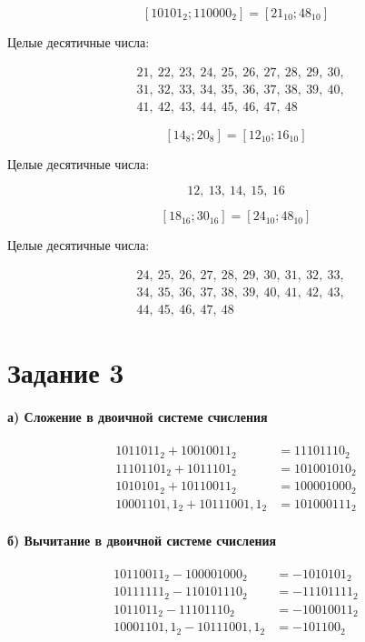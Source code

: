\documentclass[a4paper,12pt]{article}
\begin{document}
$$
[10101_2; 110000_2] = [21_{10}; 48_{10}]
$$

Целые десятичные числа:

$$
\begin{aligned}
&21,\ 22,\ 23,\ 24,\ 25,\ 26,\ 27,\ 28,\ 29,\ 30,\\
&31,\ 32,\ 33,\ 34,\ 35,\ 36,\ 37,\ 38,\ 39,\ 40,\\
&41,\ 42,\ 43,\ 44,\ 45,\ 46,\ 47,\ 48
\end{aligned}
$$

$$
[14_8; 20_8] = [12_{10}; 16_{10}]
$$

Целые десятичные числа:

$$
12,\ 13,\ 14,\ 15,\ 16
$$

$$
[18_{16}; 30_{16}] = [24_{10}; 48_{10}]
$$

Целые десятичные числа:

$$
\begin{aligned}
&24,\ 25,\ 26,\ 27,\ 28,\ 29,\ 30,\ 31,\ 32,\ 33,\\
&34,\ 35,\ 36,\ 37,\ 38,\ 39,\ 40,\ 41,\ 42,\ 43,\\
&44,\ 45,\ 46,\ 47,\ 48
\end{aligned}
$$
\section*{Задание 3}

\paragraph{а) Сложение в двоичной системе счисления}

$$
\begin{aligned}
1011011_2 + 10010011_2 &= 11101110_2 \\
11101101_2 + 1011101_2 &= 101001010_2 \\
1010101_2 + 10110011_2 &= 100001000_2 \\
10001101{,}1_2 + 10111001{,}1_2 &= 101000111_2
\end{aligned}
$$

\paragraph{б) Вычитание в двоичной системе счисления}

$$
\begin{aligned}
10110011_2 - 100001000_2 &= -1010101_2 \\
10111111_2 - 110101110_2 &= -11101111_2 \\
1011011_2 - 11101110_2 &= -10010011_2 \\
10001101{,}1_2 - 10111001{,}1_2 &= -101100_2
\end{aligned}
$$
\end{document}
